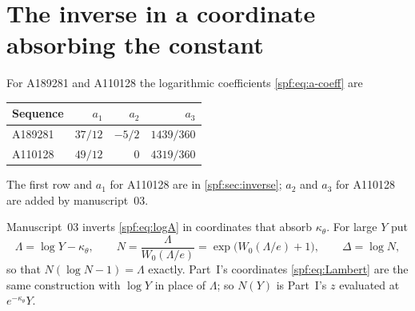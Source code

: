 \documentclass[11pt]{article}
\numberwithin{equation}{section}
\theoremstyle{definition}
\theoremstyle{remark}
\theoremstyle{definition}
\begin{document}
\section{The inverse in a coordinate absorbing the constant}
\label{fga:sec:inverse}

For A189281 and A110128 the logarithmic coefficients \eqref{spf:eq:a-coeff}
are
\begin{center}
\begin{tabular}{lrrr}
\toprule
Sequence & $a_1$ & $a_2$ & $a_3$\\
\midrule
A189281 & $37/12$ & $-5/2$ & $1439/360$\\
A110128 & $49/12$ & $0$ & $4319/360$\\
\bottomrule
\end{tabular}
\end{center}
The first row and $a_1$ for A110128 are in \cref{spf:sec:inverse}; $a_2$ and
$a_3$ for A110128 are added by manuscript~03.

Manuscript~03 inverts \eqref{spf:eq:logA} in coordinates that absorb
$\kappa_\theta$. For large $Y$ put
\begin{equation}
 \Lambda=\log Y-\kappa_\theta,\qquad N=\frac\Lambda{W_0(\Lambda/e)}
 =\exp\bigl(W_0(\Lambda/e)+1\bigr),\qquad\Delta=\log N,
 \label{fga:eq:coords}
\end{equation}
so that $N(\log N-1)=\Lambda$ exactly. Part~I's coordinates
\eqref{spf:eq:Lambert} are the same construction with $\log Y$ in place of
$\Lambda$; so $N(Y)$ is Part~I's $z$ evaluated at $e^{-\kappa_\theta}Y$.
\end{document}
